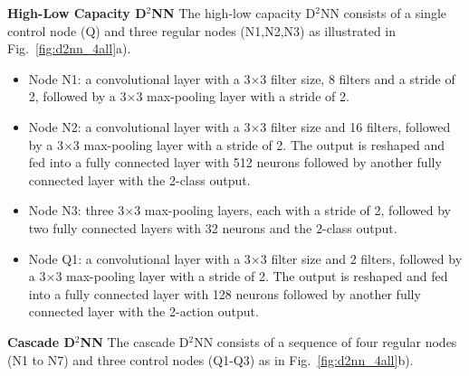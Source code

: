 \documentclass[10pt,twocolumn,letterpaper]{article}
\newcommand{\smallparagraph}[1]{\smallskip \noindent \textbf{#1}}
\begin{document}
\smallparagraph{High-Low Capacity D$^2$NN}
The high-low capacity D$^2$NN consists of a single control node (Q) and three regular nodes
(N1,N2,N3) as illustrated in Fig.~\ref{fig:d2nn_4all}a). 

\begin{itemize}
\item Node N1: a convolutional layer with a 3$\times$3 filter size, 8 filters and a stride of 2,
  followed by a 3$\times$3 max-pooling layer with a stride of 2.
\item Node N2: a convolutional layer with a 3$\times$3 filter size and 16 filters,
  followed by a 3$\times$3 max-pooling layer with a stride of 2. The output is reshaped
  and fed into a fully connected layer with 512 neurons followed by another fully connected
  layer with the 2-class output.
\item Node N3: three 3$\times$3 max-pooling layers, each with a stride of 2, followed
  by two fully connected layers with 32 neurons and the 2-class output.
\item Node Q1: a convolutional layer with a 3$\times$3 filter size and 2 filters,
  followed by a 3$\times$3 max-pooling layer with a stride of 2. The output is reshaped
  and fed into a fully connected layer with 128 neurons followed by another fully connected
  layer with the 2-action output.
\end{itemize}

\smallparagraph{Cascade D$^2$NN}
The cascade D$^2$NN consists of a sequence of four regular
nodes (N1 to N7) and three control nodes (Q1-Q3) as in Fig.~\ref{fig:d2nn_4all}b).
\end{document}
